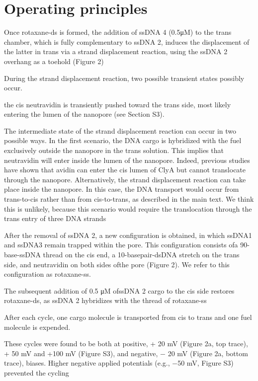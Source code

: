 \section{Operating principles}

Once rotaxane-ds is formed, the addition of ssDNA 4 (0.5μM) to the trans chamber, which
is fully complementary to ssDNA 2, induces the displacement of the latter in trans via a
strand displacement reaction, using the ssDNA 2 overhang as a toehold (Figure 2)

During the strand displacement reaction, two possible transient states possibly occur.


the cis neutravidin is transiently pushed toward
the trans side, most likely entering the lumen of the nanopore (see Section S3).

The intermediate state of the strand displacement reaction can occur in two possible
ways. In the first scenario, the DNA cargo is hybridized with the fuel exclusively
outside the nanopore in the trans solution. This implies that neutravidin will enter
inside the lumen of the nanopore. Indeed, previous studies have shown that avidin can
enter the cis lumen of ClyA but cannot translocate through the nanopore. Alternatively,
the strand displacement reaction can  take place inside the nanopore. In this case, the
DNA transport would occur from trans-to-cis rather than from cis-to-trans, as described
in the main text. We think this is unlikely, because this scenario would require the
translocation through the trans entry of three DNA strands


After the removal of ssDNA 2,
a new configuration is obtained, in which ssDNA1 and ssDNA3 remain trapped within the
pore. This configuration consists ofa 90-base-ssDNA thread on the cis end, a
10-basepair-dsDNA stretch on the trans side, and neutravidin on both sides ofthe pore
(Figure 2). We refer to this configuration as rotaxane-ss.

The subsequent addition of 0.5 μM ofssDNA 2 cargo to the cis side restores rotaxane-ds,
as ssDNA 2 hybridizes with the thread of rotaxane-ss

After each cycle, one cargo molecule is transported from cis to trans and one fuel
molecule is expended.

These cycles were found to be both at positive, + 20 mV (Figure 2a, top trace), + 50 mV
and +100 mV (Figure S3), and negative, − 20 mV (Figure 2a,
bottom trace), biases. Higher negative applied potentials (e.g., −50 mV, Figure S3)
prevented the cycling

